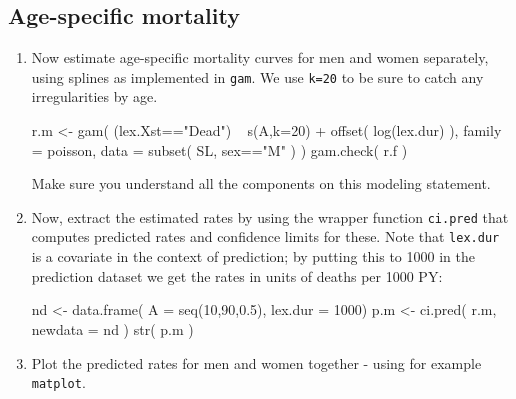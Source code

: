 \subsection*{Age-specific mortality}
\begin{enumerate}[resume]
\item Now estimate age-specific mortality curves for men and
  women separately, using splines as implemented in \texttt{gam}.
  We use \texttt{k=20} to be sure to catch any irregularities by age.
\begin{Schunk}
\begin{Sinput}
 r.m <- gam( (lex.Xst=="Dead") ~ s(A,k=20) + offset( log(lex.dur) ),
             family = poisson,
             data = subset( SL, sex=="M" ) )
 gam.check( r.f )
\end{Sinput}
\end{Schunk}
Make sure you understand all the components on this modeling statement.
\item Now, extract the estimated rates by using the wrapper function
  \texttt{ci.pred} that computes predicted rates and confidence
  limits for these.
  Note that \texttt{lex.dur} is a covariate in the context of
  prediction; by putting this to 1000 in the prediction dataset we get
  the rates in units of deaths per 1000 PY:
\begin{Schunk}
\begin{Sinput}
 nd <-  data.frame( A = seq(10,90,0.5),
              lex.dur = 1000)
 p.m <- ci.pred( r.m, newdata = nd )
 str( p.m )
\end{Sinput}
\end{Schunk}
\item Plot the predicted rates for men and women together - using for
  example \texttt{matplot}.
\begin{Schunk}
\end{Schunk}
\end{enumerate}
